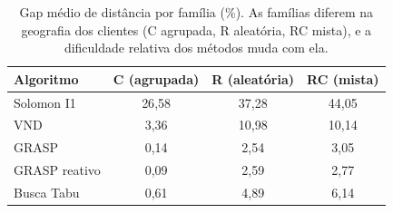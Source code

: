 \begin{table}[H]
\centering
\caption{Gap médio de distância por família (\%). As famílias diferem na geografia dos clientes (C agrupada, R aleatória, RC mista), e a dificuldade relativa dos métodos muda com ela.}\label{tab:familia}
\begin{tabular}{lccc}
\toprule
\textbf{Algoritmo} & \textbf{C (agrupada)} & \textbf{R (aleatória)} & \textbf{RC (mista)} \\
\midrule
Solomon I1 & 26{,}58 & 37{,}28 & 44{,}05 \\
VND & 3{,}36 & 10{,}98 & 10{,}14 \\
GRASP & 0{,}14 & 2{,}54 & 3{,}05 \\
GRASP reativo & 0{,}09 & 2{,}59 & 2{,}77 \\
Busca Tabu & 0{,}61 & 4{,}89 & 6{,}14 \\
\bottomrule
\end{tabular}
\end{table}
